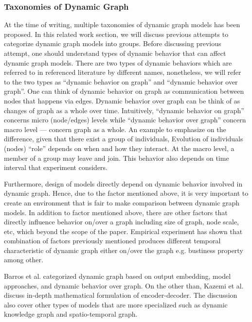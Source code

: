 \documentclass{IEEEtran}
\begin{document}
\subsubsection{Taxonomies of Dynamic Graph}
\label{taxonomies of dynamic graph}
At the time of writing, multiple taxonomies of dynamic graph models has been proposed. In this related work section, we will discuss previous attempts to categorize dynamic graph models into groups. Before discussing previous attempt, one should understand types of dynamic behavior that can affect dynamic graph models. There are two types of dynamic behaviors which are referred to in referenced literature by different names, nonetheless, we will refer to the two types as ``dynamic behavior on graph'' and ``dynamic behavior over graph''. One can think of dynamic behavior on graph as communication between nodes that happens via edges. Dynamic  behavior over graph can be think of as changes of graph as a whole over time. Intuitively, ``dynamic behavior on graph'' concerns micro (node/edges) levels while ``dynamic behavior over graph'' concern macro level --- concern graph as a whole. An example to emphasize on the difference, given that there exist a group of individuals, Evolution of individuals (nodes) ``role'' depends on when and how they interact. At the macro level, a member of a group may leave and join. This behavior also depends on time interval that experiment considers.

Furthermore, design of models directly depend on dynamic behavior involved in dynamic graph. Hence, due to the factor mentioned above, it is very important to create an environment that is fair to make comparison between dynamic graph models. In addition to factor mentioned above, there are other factors that directly influence behavior on/over a graph including size of graph, node scale, etc, which beyond the scope of the paper. Empirical experiment has shown that combination of factors previously mentioned produces different temporal characteristic of dynamic graph either on/over the graph e.g. bustiness property \cite{holme2012temporal} among other.

Barros et al. \cite{barrosSurveyEmbeddingDynamic2021} categorized dynamic graph based on output embedding, model approaches, and dynamic behavior over graph. On the other than, Kazemi et al. \cite{kazemiRepresentationLearningDynamica} discuss in-depth mathematical formulation of encoder-decoder. The discussion also cover other types of models that are more specialized such as dynamic knowledge graph and spatio-temporal graph.
\end{document}
